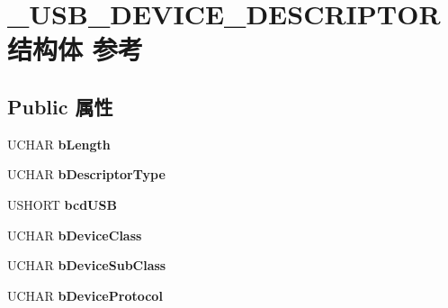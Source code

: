 \hypertarget{struct___u_s_b___d_e_v_i_c_e___d_e_s_c_r_i_p_t_o_r}{}\section{\+\_\+\+U\+S\+B\+\_\+\+D\+E\+V\+I\+C\+E\+\_\+\+D\+E\+S\+C\+R\+I\+P\+T\+O\+R结构体 参考}
\label{struct___u_s_b___d_e_v_i_c_e___d_e_s_c_r_i_p_t_o_r}
\subsection*{Public 属性}
\begin{DoxyCompactItemize}
\item 
\mbox{\label{struct___u_s_b___d_e_v_i_c_e___d_e_s_c_r_i_p_t_o_r_a4a95c305a9214a2a316cf4822c35653c}} 
U\+C\+H\+AR {\bfseries b\+Length}
\item 
\mbox{\label{struct___u_s_b___d_e_v_i_c_e___d_e_s_c_r_i_p_t_o_r_a0ba616f777f169258eceffed24b517be}} 
U\+C\+H\+AR {\bfseries b\+Descriptor\+Type}
\item 
\mbox{\label{struct___u_s_b___d_e_v_i_c_e___d_e_s_c_r_i_p_t_o_r_a64361670920d345aabac7b85e174031b}} 
U\+S\+H\+O\+RT {\bfseries bcd\+U\+SB}
\item 
\mbox{\label{struct___u_s_b___d_e_v_i_c_e___d_e_s_c_r_i_p_t_o_r_ad0350e9c66eebe36dfcd9b40edc12e73}} 
U\+C\+H\+AR {\bfseries b\+Device\+Class}
\item 
\mbox{\label{struct___u_s_b___d_e_v_i_c_e___d_e_s_c_r_i_p_t_o_r_a1a836e69433abc0f0b18ec3da7e0f54c}} 
U\+C\+H\+AR {\bfseries b\+Device\+Sub\+Class}
\item 
\mbox{\label{struct___u_s_b___d_e_v_i_c_e___d_e_s_c_r_i_p_t_o_r_a44495ecc731915b95a553663c4123ef0}} 
U\+C\+H\+AR {\bfseries b\+Device\+Protocol}
\item 
\mbox{\label{struct___u_s_b___d_e_v_i_c_e___d_e_s_c_r_i_p_t_o_r_a01f43eeb1a6fc9da9beb1a883f08b7e8}} 

\end{DoxyCompactItemize}
